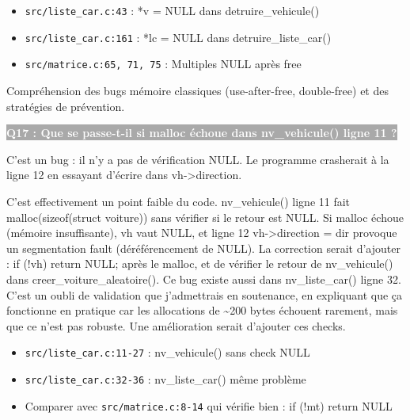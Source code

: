 \documentclass[12pt,a4paper]{article}
\newcommand{\question}[1]{%
    \vspace{0.5cm}
    \noindent\colorbox{darkgray}{\textcolor{white}{\textbf{#1}}}
    \vspace{0.3cm}
}
\begin{document}
\begin{reference_code}
\begin{itemize}
    \item \texttt{src/liste\_car.c:43} : *v = NULL dans detruire\_vehicule()
    \item \texttt{src/liste\_car.c:161} : *lc = NULL dans detruire\_liste\_car()
    \item \texttt{src/matrice.c:65, 71, 75} : Multiples NULL après free
\end{itemize}
\end{reference_code}

\begin{objectif_prof}
Compréhension des bugs mémoire classiques (use-after-free, double-free) et des stratégies de prévention.
\end{objectif_prof}

\question{Q17 : Que se passe-t-il si malloc échoue dans nv\_vehicule() ligne 11 ?}

\begin{reponse_courte}
C'est un bug : il n'y a pas de vérification NULL. Le programme crasherait à la ligne 12 en essayant d'écrire dans vh->direction.
\end{reponse_courte}

\begin{reponse_longue}
C'est effectivement un point faible du code. nv\_vehicule() ligne 11 fait malloc(sizeof(struct voiture)) sans vérifier si le retour est NULL. Si malloc échoue (mémoire insuffisante), vh vaut NULL, et ligne 12 vh->direction = dir provoque un segmentation fault (déréférencement de NULL). La correction serait d'ajouter : if (!vh) return NULL; après le malloc, et de vérifier le retour de nv\_vehicule() dans creer\_voiture\_aleatoire(). Ce bug existe aussi dans nv\_liste\_car() ligne 32. C'est un oubli de validation que j'admettrais en soutenance, en expliquant que ça fonctionne en pratique car les allocations de \textasciitilde{}200 bytes échouent rarement, mais que ce n'est pas robuste. Une amélioration serait d'ajouter ces checks.
\end{reponse_longue}

\begin{reference_code}
\begin{itemize}
    \item \texttt{src/liste\_car.c:11-27} : nv\_vehicule() sans check NULL
    \item \texttt{src/liste\_car.c:32-36} : nv\_liste\_car() même problème
    \item Comparer avec \texttt{src/matrice.c:8-14} qui vérifie bien : if (!mt) return NULL
\end{itemize}
\end{reference_code}
\end{document}
